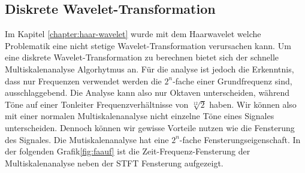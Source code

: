 \subsection{Diskrete Wavelet-Transformation}
Im Kapitel \ref{chapter:haar-wavelet} wurde mit dem Haarwavelet welche Problematik eine nicht stetige Wavelet-Transformation verursachen kann. Um eine diskrete Wavelet-Transformation zu berechnen bietet sich der schnelle Multiskalenanalyse Algorhytmus an. Für die analyse ist jedoch die Erkenntnis, dass nur Frequenzen verwendet werden die $2^n$-fache einer Grundfrequenz sind, ausschlaggebend. Die Analyse kann also nur Oktaven unterscheiden, während Töne auf einer Tonleiter Frequenzverhältnisse von $\sqrt[12]{2}$ haben. Wir können also mit einer normalen Multiskalenanalyse nicht einzelne Töne eines Signales unterscheiden. Dennoch können wir gewisse Vorteile nutzen wie die Fensterung des Signales. Die Mutiskalenanalyse hat eine $2^n$-fache Fensterungseigenschaft. In der folgenden Grafik\ref{fig:faauf} ist die Zeit-Frequenz-Fensterung der Multiskalenanalyse neben der STFT Fensterung aufgezeigt.   

